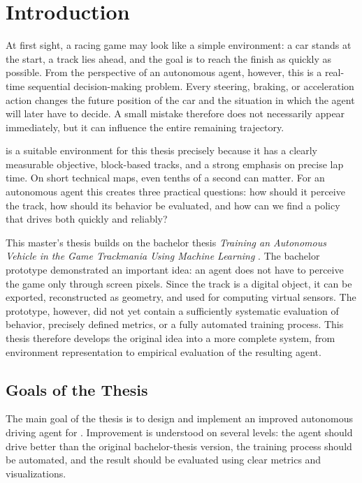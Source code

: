 \chapter*{Introduction}

At first sight, a racing game may look like a simple environment: a car stands at the start, a track lies ahead, and the goal is to reach the finish as quickly as possible. From the perspective of an autonomous agent, however, this is a real-time sequential decision-making problem. Every steering, braking, or acceleration action changes the future position of the car and the situation in which the agent will later have to decide. A small mistake therefore does not necessarily appear immediately, but it can influence the entire remaining trajectory.

\Trackmania{} is a suitable environment for this thesis precisely because it has a clearly measurable objective, block-based tracks, and a strong emphasis on precise lap time. On short technical maps, even tenths of a second can matter. For an autonomous agent this creates three practical questions: how should it perceive the track, how should its behavior be evaluated, and how can we find a policy that drives both quickly and reliably?

This master's thesis builds on the bachelor thesis \emph{Training an Autonomous Vehicle in the Game Trackmania Using Machine Learning} \cite{melkovic2024bachelor}. The bachelor prototype demonstrated an important idea: an agent does not have to perceive the game only through screen pixels. Since the track is a digital object, it can be exported, reconstructed as geometry, and used for computing virtual sensors. The prototype, however, did not yet contain a sufficiently systematic evaluation of behavior, precisely defined metrics, or a fully automated training process. This thesis therefore develops the original idea into a more complete system, from environment representation to empirical evaluation of the resulting agent.

\section*{Goals of the Thesis}

The main goal of the thesis is to design and implement an improved autonomous driving agent for \Trackmania{}. Improvement is understood on several levels: the agent should drive better than the original bachelor-thesis version, the training process should be automated, and the result should be evaluated using clear metrics and visualizations.

